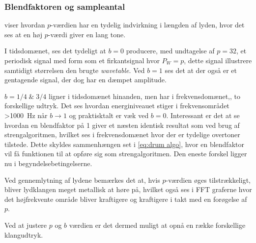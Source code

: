 \subsubsection{Blendfaktoren og sampleantal}


 viser hvordan $p$-værdien har en tydelig indvirkning i længden af lyden, hvor det ses at en høj $p$-værdi giver en lang tone.

I tidsdomænet, ses det tydeligt at $b=0$ producere, med undtagelse af $p=32$, et periodisk signal med form som et firkantsignal hvor $P_W = p$, dette signal illustrere samtidigt størrelsen den brugte \emph{wavetable}. Ved $b=1$ ses det at der også er et gentagende signal, der dog har en dæmpet amplitude.

$b=1/4 \; \& \; 3/4$ ligner i tidsdomænet hinanden, men har i frekvensdomænet,, to forskellige udtryk. Det ses hvordan energiniveauet stiger i frekvensområdet \SI{>1000}{Hz} når $b \to 1$ og praktisktalt er væk ved $b=0$. Interessant er det at se hvordan en blendfaktor på 1 giver et næsten identisk resultat som ved brug af strengalgoritmen, hvilket ses i frekvensdomænet hvor der er tydelige overtoner tilstede. Dette skyldes sammenhængen set i \eqref{eq:drum algo}, hvor en blendfaktor vil få funktionen til at opføre sig som strengalgoritmen. Den eneste forskel ligger nu i begyndelsebetingelserne.

Ved gennemlytning af lydene bemærkes det at, hvis $p$-værdien øges tilstrækkeligt, bliver lydklangen meget metallisk at høre på, hvilket også ses i FFT graferne hvor det højfrekvente område bliver kraftigere og kraftigere i takt med en forøgelse af $p$.

Ved at justere $p$ og $b$ værdien er det dermed muligt at opnå en række forskellige klangudtryk.